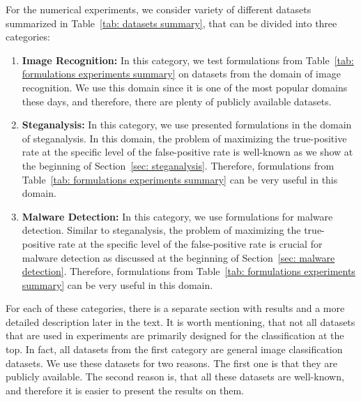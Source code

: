 For the numerical experiments, we consider variety of different datasets summarized in Table~\ref{tab: datasets summary}, that can be divided into three categories:
\begin{enumerate}
  \item \textbf{Image Recognition:} In this category, we test formulations from Table~\ref{tab: formulations experiments summary} on datasets from the domain of image recognition. We use this domain since it is one of the most popular domains these days, and therefore, there are plenty of publicly available datasets.
  \item \textbf{Steganalysis:} In this category, we use presented formulations in the domain of steganalysis. In this domain, the problem of maximizing the true-positive rate at the specific level of the false-positive rate is well-known as we show at the beginning of Section~\ref{sec: steganalysis}. Therefore, formulations from Table~\ref{tab: formulations experiments summary} can be very useful in this domain.
  \item \textbf{Malware Detection:} In this category, we use formulations for malware detection. Similar to steganalysis,  the problem of maximizing the true-positive rate at the specific level of the false-positive rate is crucial for malware detection as discussed at the beginning of Section~\ref{sec: malware detection}. Therefore, formulations from Table~\ref{tab: formulations experiments summary} can be very useful in this domain.
\end{enumerate}
For each of these categories, there is a separate section with results and a more detailed description later in the text. It is worth mentioning, that not all datasets that are used in experiments are primarily designed for the classification at the top. In fact, all datasets from the first category are general image classification datasets. We use these datasets for two reasons. The first one is that they are publicly available. The second reason is, that all these datasets are well-known, and therefore it is easier to present the results on them.

